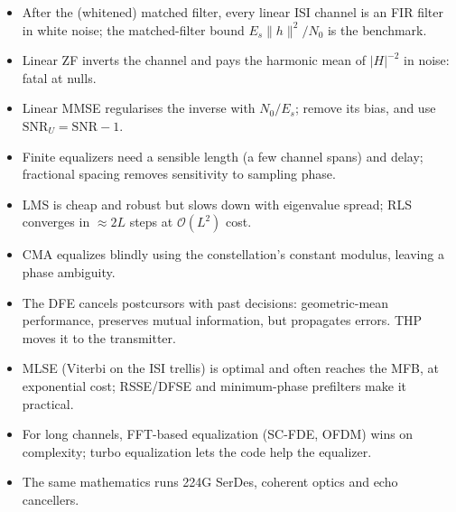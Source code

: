 \begin{keyidea}
\begin{itemize}
\item After the (whitened) matched filter, every linear ISI channel is an FIR filter in white noise;
the matched-filter bound $E_s\|h\|^2/N_0$ is the benchmark.
\item Linear ZF inverts the channel and pays the harmonic mean of $|H|^{-2}$ in noise: fatal at nulls.
\item Linear MMSE regularises the inverse with $N_0/E_s$; remove its bias, and use
$\mathrm{SNR}_U=\mathrm{SNR}-1$.
\item Finite equalizers need a sensible length (a few channel spans) and delay; fractional spacing
removes sensitivity to sampling phase.
\item LMS is cheap and robust but slows down with eigenvalue spread; RLS converges in $\approx2L$ steps
at $\mathcal O(L^2)$ cost.
\item CMA equalizes blindly using the constellation's constant modulus, leaving a phase ambiguity.
\item The DFE cancels postcursors with past decisions: geometric-mean performance, preserves mutual
information, but propagates errors. THP moves it to the transmitter.
\item MLSE (Viterbi on the ISI trellis) is optimal and often reaches the MFB, at exponential cost;
RSSE/DFSE and minimum-phase prefilters make it practical.
\item For long channels, FFT-based equalization (SC-FDE, OFDM) wins on complexity; turbo equalization
lets the code help the equalizer.
\item The same mathematics runs 224G SerDes, coherent optics and echo cancellers.
\end{itemize}
\end{keyidea}


